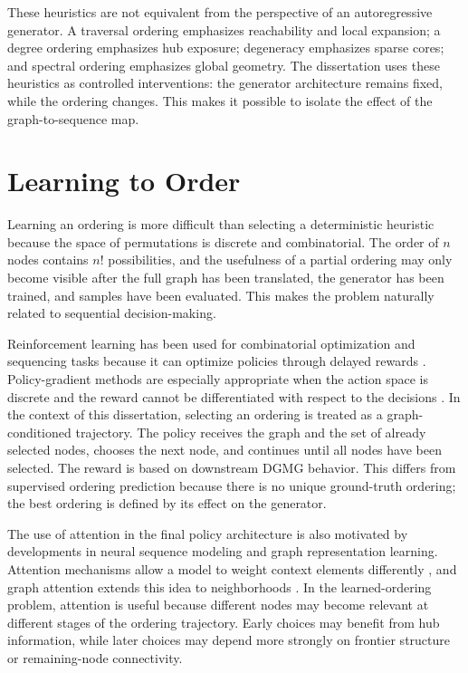These heuristics are not equivalent from the perspective of an autoregressive generator. A traversal ordering emphasizes reachability and local expansion; a degree ordering emphasizes hub exposure; degeneracy emphasizes sparse cores; and spectral ordering emphasizes global geometry. The dissertation uses these heuristics as controlled interventions: the generator architecture remains fixed, while the ordering changes. This makes it possible to isolate the effect of the graph-to-sequence map.

\section{Learning to Order}
\label{sec:related-learning-order}

Learning an ordering is more difficult than selecting a deterministic heuristic because the space of permutations is discrete and combinatorial. The order of $n$ nodes contains $n!$ possibilities, and the usefulness of a partial ordering may only become visible after the full graph has been translated, the generator has been trained, and samples have been evaluated. This makes the problem naturally related to sequential decision-making.

Reinforcement learning has been used for combinatorial optimization and sequencing tasks because it can optimize policies through delayed rewards \cite{sutton2018reinforcement}. Policy-gradient methods are especially appropriate when the action space is discrete and the reward cannot be differentiated with respect to the decisions \cite{williams1992reinforce}. In the context of this dissertation, selecting an ordering is treated as a graph-conditioned trajectory. The policy receives the graph and the set of already selected nodes, chooses the next node, and continues until all nodes have been selected. The reward is based on downstream DGMG behavior. This differs from supervised ordering prediction because there is no unique ground-truth ordering; the best ordering is defined by its effect on the generator.

The use of attention in the final policy architecture is also motivated by developments in neural sequence modeling and graph representation learning. Attention mechanisms allow a model to weight context elements differently \cite{vaswani2017attention}, and graph attention extends this idea to neighborhoods \cite{velickovic2018gat}. In the learned-ordering problem, attention is useful because different nodes may become relevant at different stages of the ordering trajectory. Early choices may benefit from hub information, while later choices may depend more strongly on frontier structure or remaining-node connectivity.

